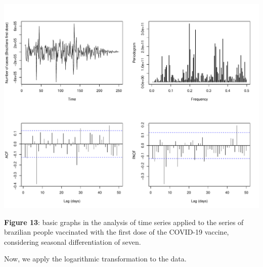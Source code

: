 \documentclass[
]{article}
\begin{document}
\begin{center}\includegraphics[width=\linewidth]{IF_results_ENG_files/figure-latex/unnamed-chunk-15-1} \end{center}

\textbf{Figure 13}: basic graphs in the analysis of time series applied
to the series of brazilian people vaccinated with the first dose of the
COVID-19 vaccine, considering seasonal differentiation of seven.

Now, we apply the logarithmic transformation to the data.
\end{document}
